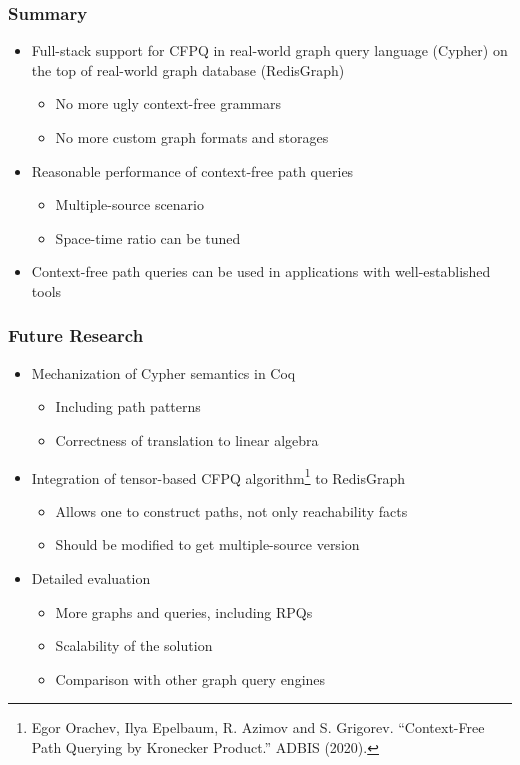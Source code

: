 \documentclass[xcolor=table,aspectratio=169]{beamer}
\begin{document}
\begin{frame}[fragile] \frametitle{Summary}
  \begin{itemize}
      \item Full-stack support for CFPQ in real-world graph query language (Cypher) on the top of real-world graph database (RedisGraph)
      \begin{itemize}
         \item No more ugly context-free grammars
         \item No more custom graph formats and storages
      \end{itemize}
      \item Reasonable performance of context-free path queries
      \begin{itemize}
         \item Multiple-source scenario
         \item Space-time ratio can be tuned
      \end{itemize}
      \item Context-free path queries can be used in applications with well-established tools
  \end{itemize}  
\end{frame}



\begin{frame}[fragile] \frametitle{Future Research}
  \begin{itemize}
    \item Mechanization of Cypher semantics in Coq
    \begin{itemize}
      \item Including path patterns
      \item Correctness of translation to linear algebra
    \end{itemize}
    \pause
    \item Integration of tensor-based CFPQ algorithm\footnote{Egor Orachev, Ilya Epelbaum, R. Azimov and S. Grigorev. “Context-Free Path Querying by Kronecker Product.” ADBIS (2020).} to RedisGraph
    \begin{itemize}
      \item Allows one to construct paths, not only reachability facts
      \item Should be modified to get multiple-source version
    \end{itemize}
    \pause
    \item Detailed evaluation
    \begin{itemize}
      \item More graphs and queries, including RPQs      
      \item Scalability of the solution
      \item Comparison with other graph query engines
    \end{itemize}
  \end{itemize}
\end{frame}
\end{document}
